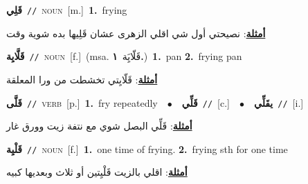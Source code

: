 \documentclass[10pt,a4paper,twoside]{article} %
\begin{document}
\begin{multicols}{2}
{\setlength\topsep{0pt}\textbf{\foreignlanguage{arabic}{قَلِي}}\ {\color{gray}\texttt{//}\color{black}}\ \textsc{noun}\ [m.]\ \textbf{1.}~frying\  \begin{flushright}\color{gray}\foreignlanguage{arabic}{\textbf{\underline{\foreignlanguage{arabic}{أمثلة}}}: نصيحتي أول شي اقلي الزهرى عشان قَلِيها بده شوية وقت}\end{flushright}\color{black}} \vspace{2mm}

{\setlength\topsep{0pt}\textbf{\foreignlanguage{arabic}{قَلَّايِة}}\ {\color{gray}\texttt{//}\color{black}}\ \textsc{noun}\ [f.]\ \color{gray}(msa. \foreignlanguage{arabic}{قَلّايَِة}~\foreignlanguage{arabic}{\textbf{١.}})\color{black}\ \textbf{1.}~pan  \textbf{2.}~frying pan\  \begin{flushright}\color{gray}\foreignlanguage{arabic}{\textbf{\underline{\foreignlanguage{arabic}{أمثلة}}}: قَلّايِتي تخشطت من ورا المعلقة}\end{flushright}\color{black}} \vspace{2mm}

{\setlength\topsep{0pt}\textbf{\foreignlanguage{arabic}{قَلَّى}}\ {\color{gray}\texttt{//}\color{black}}\ \textsc{verb}\ [p.]\ \textbf{1.}~fry repeatedly\ \ $\bullet$\ \ \setlength\topsep{0pt}\textbf{\foreignlanguage{arabic}{قَلِّي}}\ {\color{gray}\texttt{//}\color{black}}\ [c.]\ \ $\bullet$\ \ \setlength\topsep{0pt}\textbf{\foreignlanguage{arabic}{يقَلِّي}}\ {\color{gray}\texttt{//}\color{black}}\ [i.]\  \begin{flushright}\color{gray}\foreignlanguage{arabic}{\textbf{\underline{\foreignlanguage{arabic}{أمثلة}}}: قَلِّي البصل شوي مع نتفة زيت وورق غار}\end{flushright}\color{black}} \vspace{2mm}

{\setlength\topsep{0pt}\textbf{\foreignlanguage{arabic}{قَلْيِة}}\ {\color{gray}\texttt{//}\color{black}}\ \textsc{noun}\ [f.]\ \textbf{1.}~one time of frying.  \textbf{2.}~frying sth for one time\  \begin{flushright}\color{gray}\foreignlanguage{arabic}{\textbf{\underline{\foreignlanguage{arabic}{أمثلة}}}: اقلي بالزيت قَلْيِتين أو ثلاث وبعديها كبيه}\end{flushright}\color{black}} \vspace{2mm}


\end{multicols}
\end{document}
